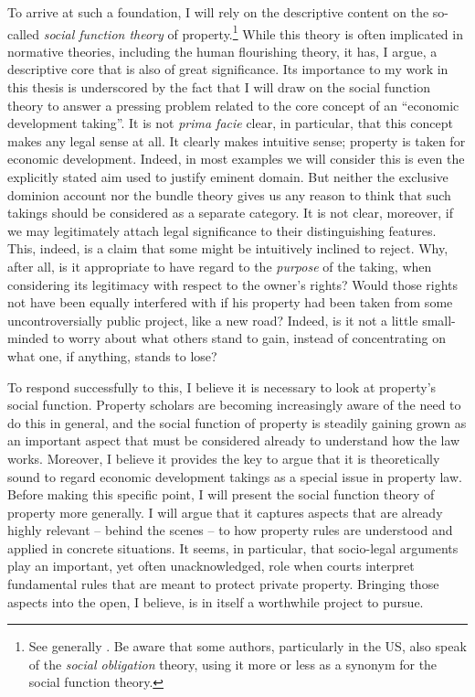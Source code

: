 To arrive at such a foundation, I will rely on the descriptive content on the so-called {\it social function theory} of property.\footnote{See generally \cite{foster11,mirow10,alexander09a}. Be aware that some authors, particularly in the US, also speak of the {\it social obligation} theory, using it more or less as a synonym for the social function theory.} While this theory is often implicated in normative theories, including the human flourishing theory, it has, I argue, a descriptive core that is also of great significance. Its importance to my work in this thesis is underscored by the fact that I will draw on the social function theory to answer a pressing problem related to the core concept of an ``economic development taking''. It is not {\it prima facie} clear, in particular, that this concept makes any legal sense at all. It clearly makes intuitive sense; property is taken for economic development. Indeed, in most examples we will consider this is even the explicitly stated aim used to justify eminent domain. But neither the exclusive dominion account nor the bundle theory gives us any reason to think that such takings should be considered as a separate category. It is not clear, moreover, if we may legitimately attach legal significance to their distinguishing features. This, indeed, is a claim that some might be intuitively inclined to reject. Why, after all, is it appropriate to have regard to the {\it purpose} of the taking, when considering its legitimacy with respect to the owner's rights? Would those rights not have been equally interfered with if his property had been taken from some uncontroversially public project, like a new road? Indeed, is it not a little small-minded to worry about what others stand to gain, instead of concentrating on what one, if anything, stands to lose?

To respond successfully to this, I believe it is necessary to look at property's social function. Property scholars are becoming increasingly aware of the need to do this in general, and the social function of property is steadily gaining grown as an important aspect that must be considered already to understand how the law works. Moreover, I believe it provides the key to argue that it is theoretically sound to regard economic development takings as a special issue in property law. Before making this specific point, I will present the social function theory of property more generally. I will argue that it captures aspects that are already highly relevant -- behind the scenes -- to how property rules are understood and applied in concrete situations. It seems, in particular, that socio-legal arguments play an important, yet often unacknowledged, role when courts interpret fundamental rules that are meant to protect private property. Bringing those aspects into the open, I believe, is in itself a worthwhile project to pursue.

